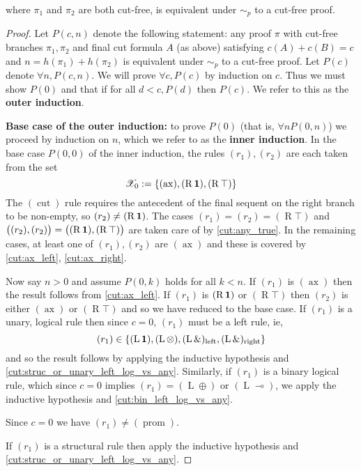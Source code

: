 \documentclass[12pt]{article}
\theoremstyle{plain}
\theoremstyle{definition}
\newcommand{\scr}[1]{\mathscr{#1}}
\newcommand{\rone}{(\operatorname{R}\bold{1})}
\newcommand{\lone}{(\operatorname{L}\bold{1})}
\newcommand{\limp}{(\operatorname{L} \multimap)}
\newcommand{\ltensor}{(\operatorname{L}\otimes)}
\newcommand{\rtrue}{(\operatorname{R}\top)}
\newcommand{\lwithleft}{(\operatorname{L}\&)_{\operatorname{left}}}
\newcommand{\lwithright}{(\operatorname{L}\&)_{\operatorname{right}}}
\newcommand{\lplus}{(\operatorname{L}\oplus)}
\newcommand{\prom}{(\operatorname{prom})}
\newcommand{\cut}{(\operatorname{cut})}
\newcommand{\ax}{(\operatorname{ax})}
\begin{document}
where $\pi_1$ and $\pi_2$ are both cut-free, is equivalent under $\sim_p$ to a cut-free proof.
\begin{proof}
Let $P(c,n)$ denote the following statement: any proof $\pi$ with cut-free branches $\pi_1,\pi_2$ and final cut formula $A$ (as above) satisfying $c(A) + c(B) = c$ and $n = h(\pi_1) + h(\pi_2)$ is equivalent under $\sim_p$ to a cut-free proof. Let $P(c)$ denote $\forall n, P(c,n)$. We will prove $\forall c, P(c)$ by induction on $c$. Thus we must show $P(0)$ and that if for all $d < c, P(d)$ then $P(c)$. We refer to this as the \textbf{outer induction}.

\textbf{Base case of the outer induction:} to prove $P(0)$ (that is, $\forall n P(0,n)$) we proceed by induction on $n$, which we refer to as the \textbf{inner induction}. In the base case $P(0,0)$ of the inner induction, the rules $(r_1),(r_2)$ are each taken from the set
\begin{equation}
    \scr{X}_0 := \lbrace \ax, \rone, \rtrue\rbrace
\end{equation}
The $\cut$ rule requires the antecedent of the final sequent on the right branch to be non-empty, so $(r_2) \neq \rone$. The cases $(r_1) = (r_2) = \rtrue$ and $\big((r_2),(r_2)\big) = \big(\rone, \rtrue\big)$ are taken care of by \eqref{cut:any_true}. In the remaining cases, at least one of $(r_1),(r_2)$ are $\ax$ and these is covered by \eqref{cut:ax_left}, \eqref{cut:ax_right}.

Now say $n > 0$ and assume $P(0,k)$ holds for all $k < n$. If $(r_1)$ is $\ax$ then the result follows from \eqref{cut:ax_left}. If $(r_1)$ is $\rone$ or $\rtrue$ then $(r_2)$ is either $\ax$ or $\rtrue$ and so we have reduced to the base case. If $(r_1)$ is a unary, logical rule then since $c = 0$, $(r_1)$ must be a left rule, ie,
\begin{equation}
    (r_1) \in \lbrace \lone, \ltensor, \lwithleft, \lwithright\rbrace
\end{equation}
and so the result follows by applying the inductive hypothesis and \eqref{cut:struc_or_unary_left_log_vs_any}. Similarly, if $(r_1)$ is a binary logical rule, which since $c = 0$ implies $(r_1) = \lplus$ or $\limp$, we apply the inductive hypothesis and \eqref{cut:bin_left_log_vs_any}.

Since $c = 0$ we have $(r_1) \neq \prom$.

If $(r_1)$ is a structural rule then apply the inductive hypothesis and \eqref{cut:struc_or_unary_left_log_vs_any}.


\end{proof}
\end{document}
